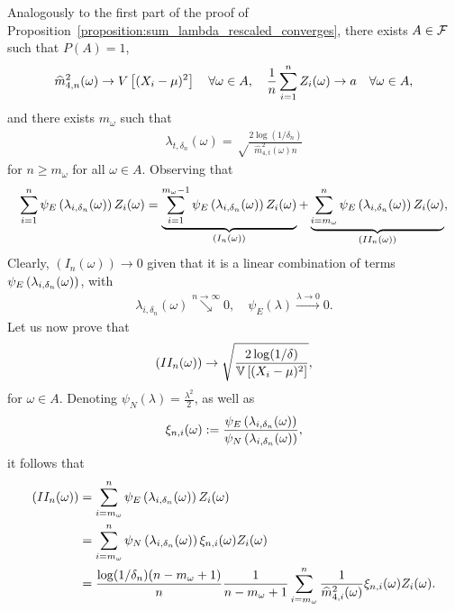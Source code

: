  Analogously to the first part of the proof of Proposition~\ref{proposition:sum_lambda_rescaled_converges}, there exists $A\in\mathcal{F}$ such that $P(A) = 1$, %
    \begin{align} \label{eq:mhat_omega_converges}
        \widehat m_{4, n}^2(\omega) \to V \left[ (X_i-\mu)^2\right] \quad \forall \omega \in A, \quad \frac{1}{n} \sum_{i=1}^n Z_i(\omega) \stackrel{}{\to} a \quad \forall  \omega \in A,
    \end{align}
    and there exists $m_\omega$ such that
    \begin{align*}
        \lambda_{t,\delta_n}(\omega) = \sqrt\frac{2\log(1/\delta_n)}{\widehat m_{4, t}^2(\omega) n}
    \end{align*}
    for $n \geq m_\omega$ for all $\omega \in A$. Observing that
    \begin{align*}
         \sum_{i = 1}^n \psi_E \left( \lambda_{i,\delta_n}(\omega)\right) Z_i(\omega) = \underbrace{\sum_{i = 1}^{m_\omega-1} \psi_E \left( \lambda_{i,\delta_n}(\omega) \right) Z_i(\omega)}_{(I_n(\omega))} + 
         \underbrace{\sum_{i = m_\omega}^n \psi_E \left( \lambda_{i,\delta_n}(\omega) \right) Z_i(\omega)}_{(II_n(\omega))},
    \end{align*}
    Clearly, $(I_n(\omega)) \to 0$ given that it is a linear combination of terms $\psi_E \left( \lambda_{i,\delta_n}(\omega) \right)$, with
    \begin{align*}
        \lambda_{i,\delta_n}(\omega) \stackrel{n\to\infty}{\searrow} 0, \quad \psi_E(\lambda) \stackrel{\lambda\to0}{\to} 0.
    \end{align*}
    Let us now prove that
    \begin{align} \label{eq:lemma_convergence_sum_psi_step2}
        (II_n(\omega)) \to \sqrt \frac{2 \log (1 / \delta)}{\mathbb{V} \left[ (X_i-\mu)^2\right]},
    \end{align}
    for $\omega \in A$. Denoting $\psi_N(\lambda) = \frac{\lambda^2}{2}$, as well as
    \begin{align*}
        \xi_{n, i}(\omega) := \frac{\psi_E \left( \lambda_{i,\delta_n}(\omega)  \right)}{\psi_N \left( \lambda_{i,\delta_n}(\omega)  \right)},
    \end{align*}
    it follows that
    \begin{align*}
        (II_n(\omega)) &= \sum_{i = m_\omega}^n \psi_E \left( \lambda_{i,\delta_n}(\omega) \right) Z_i(\omega)
        \\&= \sum_{i = m_\omega}^n \psi_N \left( \lambda_{i,\delta_n}(\omega) \right) \xi_{n, i}(\omega)  Z_i(\omega)
        \\&= \frac{\log(1/\delta_n)  (n - m_\omega + 1)}{n} \frac{1}{n - m_\omega + 1}\sum_{i = m_\omega}^n \frac{1}{\widehat m_{4, i}^2(\omega)} \xi_{n, i}(\omega)  Z_i(\omega).
    \end{align*}

